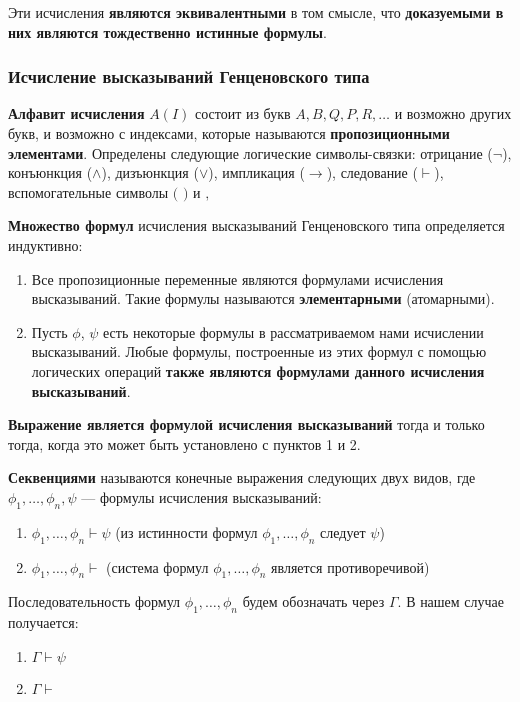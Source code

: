 \documentclass{article}
\begin{document}
Эти исчисления \textbf{являются эквивалентными} в том смысле, что \textbf{доказуемыми в них являются тождественно истинные формулы}.

\subsubsection{Исчисление высказываний Генценовского типа}

\textbf{Алфавит исчисления} $A(I)$ состоит из букв $A,B,Q,P,R,\dots$ и возможно других букв, и возможно с индексами, которые называются \textbf{пропозиционными элементами}. Определены следующие логические символы-связки: отрицание ($\lnot$), конъюнкция ($\land$), дизъюнкция ($\lor$), импликация ($\rightarrow$), следование ($\vdash$), вспомогательные символы $($ $)$ и $,$

\textbf{Множество формул} исчисления высказываний Генценовского типа определяется индуктивно:

\begin{enumerate}
    \item Все пропозиционные переменные являются формулами исчисления высказываний. Такие формулы называются \textbf{элементарными} (атомарными).
    \item Пусть $\phi$, $\psi$ есть некоторые формулы в рассматриваемом нами исчислении высказываний. Любые формулы, построенные из этих формул с помощью логических операций \textbf{также являются формулами данного исчисления высказываний}.
\end{enumerate}

\textbf{Выражение является формулой исчисления высказываний} тогда и только тогда, когда это может быть установлено с пунктов 1 и 2.

\textbf{Секвенциями} называются конечные выражения следующих двух видов, где $\phi_1, \dots, \phi_{n}, \psi$ — формулы исчисления высказываний:

\begin{enumerate}
    \item $\phi_1, \dots, \phi_{n} \vdash \psi$ (из истинности формул $\phi_1, \dots, \phi_{n}$ следует $\psi$)
    \item $\phi_1, \dots, \phi_{n} \vdash$ (система формул $\phi_1, \dots, \phi_{n}$ является противоречивой)
\end{enumerate}

Последовательность формул $\phi_1, \dots, \phi_{n}$ будем обозначать через $\Gamma$. В нашем случае получается:

\begin{enumerate}
    \item $\Gamma \vdash \psi$
    \item $\Gamma \vdash$
\end{enumerate}
\end{document}
